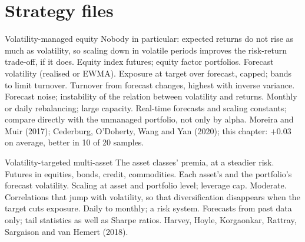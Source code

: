 \section{Strategy files}

\begin{strategyfile}{Volatility-managed equity}\label{strat:s1:volatility-targeting-and-risk-managed-portfolios:equity}
 Nobody in particular: expected returns do not rise as much as volatility, so scaling down in volatile periods improves the
risk-return trade-off, if it does.
 Equity index futures; equity factor portfolios.
 Forecast volatility (realised or EWMA).
 Exposure at target over forecast, capped; bands to limit turnover.
 Turnover from forecast changes, highest with inverse variance.
 Forecast noise; instability of the relation between volatility and returns.
 Monthly or daily rebalancing; large capacity.
 Real-time forecasts and scaling constants; compare directly with the unmanaged portfolio, not only by alpha.
 Moreira and Muir (2017); Cederburg, O'Doherty, Wang and Yan (2020); this chapter: $+0.03$ on average, better in 10 of 20 samples.
\end{strategyfile}

\begin{strategyfile}{Volatility-targeted multi-asset}\label{strat:s1:volatility-targeting-and-risk-managed-portfolios:multi}
 The asset classes' premia, at a steadier risk.
 Futures in equities, bonds, credit, commodities.
 Each asset's and the portfolio's forecast volatility.
 Scaling at asset and portfolio level; leverage cap.
 Moderate.
 Correlations that jump with volatility, so that diversification disappears when the target cuts exposure.
 Daily to monthly; a risk system.
 Forecasts from past data only; tail statistics as well as Sharpe ratios.
 Harvey, Hoyle, Korgaonkar, Rattray, Sargaison and van Hemert (2018).
\end{strategyfile}

